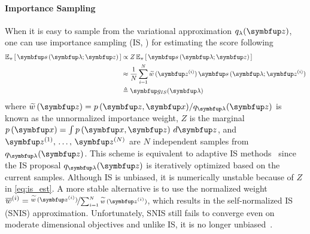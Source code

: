 \paragraph{Importance Sampling}
When it is easy to sample from the variational approximation \(q_{\lambda}(\vz)\), one can use importance sampling (IS, \citealt{robert_monte_2004}) for estimating the score following
\vspace{-0.05in}
\begin{align}
  \Esub{\pi}{ \vs\,(\vlambda;\vz) } 
  &\propto Z\,\Esub{\pi}{ \vs\,(\vlambda; \vz) } \label{eq:is_est} \\
  &\approx \frac{1}{N} \sum^{N}_{i=1} \widetilde{w}\,(\vz^{(i)}) \, \vs\,(\vlambda; \vz^{(i)}) \\
  &\triangleq \vg_{IS}(\vlambda)
\end{align}
where \(\widetilde{w}\,(\vz) = p\,(\vz,\vx) / q_{\vlambda}(\vz)\) is known as the unnormalized importance weight, \(Z\) is the marginal \(p\left(\vx\right) = \int p\left(\vx, \vz\right) \, d\vz\), and \(\vz^{(1)},\, \ldots,\, \vz^{(N)}\) are \(N\) independent samples from \(q_{\vlambda}(\vz)\).
This scheme is equivalent to adaptive IS methods~\citep{bugallo_adaptive_2017} since the IS proposal \(q_{\vlambda}(\vz)\) is iteratively optimized based on the current samples.
Although IS is unbiased, it is numerically unstable because of \(Z\) in \cref{eq:is_est}.
A more stable alternative is to use the normalized weight \(\overline{w}^{(i)} = \nicefrac{\widetilde{w}\,(\vz^{(i)})}{\sum_{i=1}^N \widetilde{w}\,(\vz^{(i)}) }\), which results in the self-normalized IS (SNIS) approximation.
Unfortunately, SNIS still fails to converge even on moderate dimensional objectives and unlike IS, it is no longer unbiased~\citep{robert_monte_2004}.

